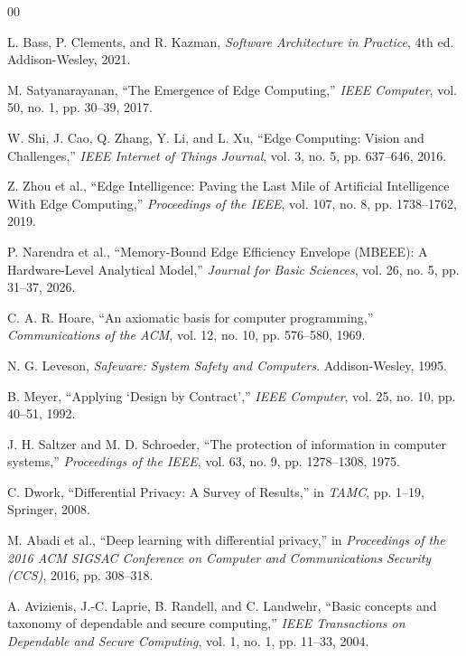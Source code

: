 \documentclass[conference]{IEEEtran}
\begin{document}
\begin{thebibliography}{00}

 L. Bass, P. Clements, and R. Kazman, \textit{Software Architecture in Practice}, 4th ed. Addison-Wesley, 2021.

 M. Satyanarayanan, ``The Emergence of Edge Computing,'' \textit{IEEE Computer}, vol. 50, no. 1, pp. 30--39, 2017.

 W. Shi, J. Cao, Q. Zhang, Y. Li, and L. Xu, ``Edge Computing: Vision and Challenges,'' \textit{IEEE Internet of Things Journal}, vol. 3, no. 5, pp. 637--646, 2016.

 Z. Zhou et al., ``Edge Intelligence: Paving the Last Mile of Artificial Intelligence With Edge Computing,'' \textit{Proceedings of the IEEE}, vol. 107, no. 8, pp. 1738--1762, 2019.

 P. Narendra et al., ``Memory-Bound Edge Efficiency Envelope (MBEEE): A Hardware-Level Analytical Model,'' \textit{Journal for Basic Sciences}, vol. 26, no. 5, pp. 31--37, 2026.

 C. A. R. Hoare, ``An axiomatic basis for computer programming,'' \textit{Communications of the ACM}, vol. 12, no. 10, pp. 576--580, 1969.

 N. G. Leveson, \textit{Safeware: System Safety and Computers}. Addison-Wesley, 1995.

 B. Meyer, ``Applying `Design by Contract','' \textit{IEEE Computer}, vol. 25, no. 10, pp. 40--51, 1992.

 J. H. Saltzer and M. D. Schroeder, ``The protection of information in computer systems,'' \textit{Proceedings of the IEEE}, vol. 63, no. 9, pp. 1278--1308, 1975.

 C. Dwork, ``Differential Privacy: A Survey of Results,'' in \textit{TAMC}, pp. 1--19, Springer, 2008.

 M. Abadi et al., ``Deep learning with differential privacy,'' in \textit{Proceedings of the 2016 ACM SIGSAC Conference on Computer and Communications Security (CCS)}, 2016, pp. 308--318.

 A. Avizienis, J.-C. Laprie, B. Randell, and C. Landwehr, ``Basic concepts and taxonomy of dependable and secure computing,'' \textit{IEEE Transactions on Dependable and Secure Computing}, vol. 1, no. 1, pp. 11--33, 2004.


\end{thebibliography}
\end{document}
